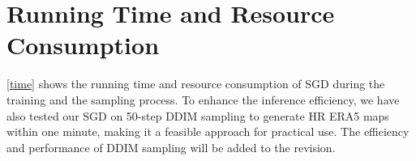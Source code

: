 \section{Running Time and Resource Consumption}
\cref{time} shows the running time and resource consumption of SGD during the training and the sampling process. 
To enhance the inference efficiency, we have also tested our SGD on 50-step DDIM sampling to generate HR ERA5 maps within one minute, making it a feasible approach for practical use.
The efficiency and performance of DDIM sampling will be added to the revision.

\begin{table}[t]
\centering
\caption{The running time and resource consumption of SGD.}
\vspace{-0.2cm}
 \label{time}
 \vspace{-0.2cm}
\end{table}

